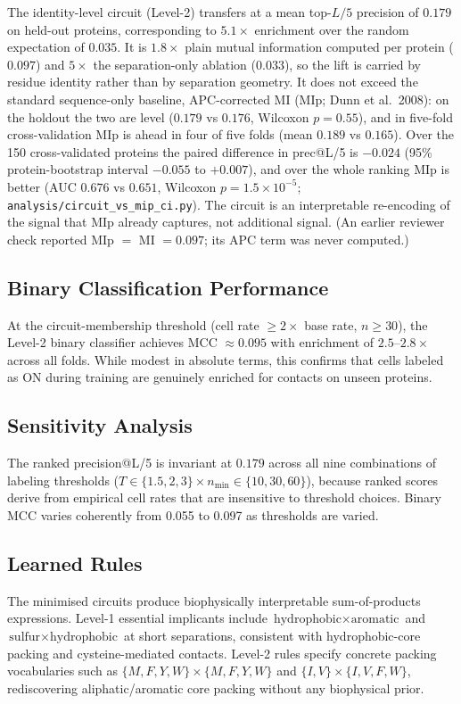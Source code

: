 The identity-level circuit (Level-2) transfers at a mean top-$L/5$ precision
of $0.179$ on held-out proteins, corresponding to $5.1\times$ enrichment over
the random expectation of $0.035$.  It is $1.8\times$ plain mutual
information computed per protein ($0.097$) and $5\times$ the separation-only
ablation ($0.033$), so the lift is carried by residue identity rather than by
separation geometry.  It does not exceed the standard sequence-only baseline,
APC-corrected MI (MIp; Dunn et al.\ 2008): on the holdout the two are level
($0.179$ vs $0.176$, Wilcoxon $p = 0.55$), and in five-fold cross-validation
MIp is ahead in four of five folds (mean $0.189$ vs $0.165$).  Over the 150
cross-validated proteins the paired difference in prec@L/5 is $-0.024$ (95\%
protein-bootstrap interval $-0.055$ to $+0.007$), and over the whole ranking
MIp is better (AUC $0.676$ vs $0.651$, Wilcoxon $p = 1.5\times10^{-5}$;
\texttt{analysis/circuit\_vs\_mip\_ci.py}).  The circuit is
an interpretable re-encoding of the signal that MIp already captures, not
additional signal.  (An earlier reviewer check reported MIp $=$ MI $= 0.097$;
its APC term was never computed.)

\subsection{Binary Classification Performance}
At the circuit-membership threshold (cell rate $\geq 2\times$ base rate,
$n \geq 30$), the Level-2 binary classifier achieves MCC $\approx 0.095$ with
enrichment of $2.5$--$2.8\times$ across all folds.  While modest in absolute
terms, this confirms that cells labeled as ON during training are genuinely
enriched for contacts on unseen proteins.

\subsection{Sensitivity Analysis}
The ranked precision@L/5 is invariant at $0.179$ across all nine combinations
of labeling thresholds ($T \in \{1.5, 2, 3\} \times n_{\min} \in \{10, 30,
	60\}$), because ranked scores derive from empirical cell rates that are
insensitive to threshold choices.  Binary MCC varies coherently from 0.055 to
0.097 as thresholds are varied.

\subsection{Learned Rules}
The minimised circuits produce biophysically interpretable sum-of-products
expressions.  Level-1 essential implicants include
$\text{hydrophobic} \times \text{aromatic}$ and
$\text{sulfur} \times \text{hydrophobic}$ at short separations, consistent
with hydrophobic-core packing and cysteine-mediated contacts.  Level-2 rules
specify concrete packing vocabularies such as
$\{M,F,Y,W\} \times \{M,F,Y,W\}$ and $\{I,V\} \times \{I,V,F,W\}$,
rediscovering aliphatic/aromatic core packing without any biophysical prior.

